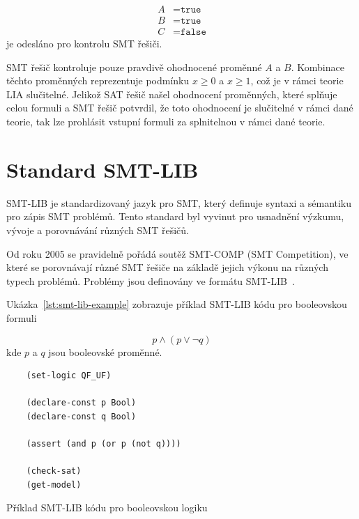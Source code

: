 \begin{align*}
    A &= \texttt{true} \\
    B &= \texttt{true} \\
    C &= \texttt{false}
\end{align*}
je odesláno pro kontrolu SMT řešiči.

SMT řešič kontroluje pouze pravdivě ohodnocené proměnné $A$ a $B$.
Kombinace těchto proměnných reprezentuje podmínku $x \geq 0$ a $x \geq 1$,
což je v rámci teorie LIA slučitelné.
Jelikož SAT řešič našel ohodnocení proměnných, které splňuje celou formuli
a SMT řešič potvrdil, že toto ohodnocení je slučitelné v rámci dané teorie,
tak lze prohlásit vstupní formuli za splnitelnou v rámci dané teorie.

\section{Standard SMT-LIB}
\label{sec:smt-lib}

SMT-LIB je standardizovaný jazyk pro SMT, který definuje syntaxi a sémantiku pro zápis SMT problémů.
Tento standard byl vyvinut pro usnadnění výzkumu, vývoje a porovnávání různých SMT řešičů.

Od roku 2005 se pravidelně pořádá soutěž SMT-COMP (SMT Competition),
ve které se porovnávají různé SMT řešiče na základě jejich výkonu na různých typech problémů.
Problémy jsou definovány ve formátu SMT-LIB~\cite{SMTCOMP}.

Ukázka~\ref{lst:smt-lib-example} zobrazuje příklad SMT-LIB kódu pro booleovskou formuli

\begin{equation*}
    p \land (p \lor \neg q)
\end{equation*}
kde $p$ a $q$ jsou booleovské proměnné.

\begin{listing}[H]
    \begin{verbatim}
    (set-logic QF_UF)

    (declare-const p Bool)
    (declare-const q Bool)

    (assert (and p (or p (not q))))

    (check-sat)
    (get-model)
    \end{verbatim}
    \caption{Příklad SMT-LIB kódu pro booleovskou logiku}
    \label{lst:smt-lib-example}
\end{listing}

